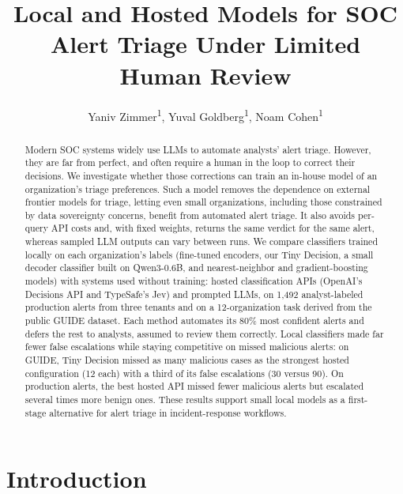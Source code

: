 \documentclass[letterpaper]{article} %
\title{Local and Hosted Models for SOC Alert Triage Under Limited Human Review}
\author{
    Yaniv Zimmer\textsuperscript{\rm 1},
    Yuval Goldberg\textsuperscript{\rm 1},
    Noam Cohen\textsuperscript{\rm 1}
}
\begin{document}
\maketitle

\begin{abstract}
Modern SOC systems widely use LLMs to automate analysts' alert triage. However, they are far from perfect, and often require a human in the loop to correct their decisions. We investigate whether those corrections can train an in-house model of an organization's triage preferences. Such a model removes the dependence on external frontier models for triage, letting even small organizations, including those constrained by data sovereignty concerns, benefit from automated alert triage. It also avoids per-query API costs and, with fixed weights, returns the same verdict for the same alert, whereas sampled LLM outputs can vary between runs. We compare classifiers trained locally on each organization's labels (fine-tuned encoders, our Tiny Decision, a small decoder classifier built on Qwen3-0.6B, and nearest-neighbor and gradient-boosting models) with systems used without training: hosted classification APIs (OpenAI's Decisions API and TypeSafe's Jev) and prompted LLMs, on 1,492 analyst-labeled production alerts from three tenants and on a 12-organization task derived from the public GUIDE dataset. Each method automates its 80\% most confident alerts and defers the rest to analysts, assumed to review them correctly. Local classifiers made far fewer false escalations while staying competitive on missed malicious alerts: on GUIDE, Tiny Decision missed as many malicious cases as the strongest hosted configuration (12 each) with a third of its false escalations (30 versus 90). On production alerts, the best hosted API missed fewer malicious alerts but escalated several times more benign ones. These results support small local models as a first-stage alternative for alert triage in incident-response workflows.
\end{abstract}

\begin{links}
\end{links}

\section{Introduction}
\end{document}
